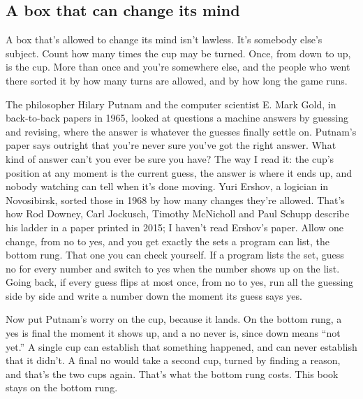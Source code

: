 \documentclass[11pt,twoside]{article}
\theoremstyle{thielethm}
\theoremstyle{thieledef}
\theoremstyle{thieledef}
\theoremstyle{thieledef}
\theoremstyle{thielethm}
\theoremstyle{thieleobs}
\theoremstyle{thielethm}
\begin{document}
\subsection{A box that can change its mind}

A box that's allowed to change its mind isn't lawless. It's somebody else's subject. Count how many times the cup may be turned. Once, from down to up, is the cup. More than once and you're somewhere else, and the people who went there sorted it by how many turns are allowed, and by how long the game runs.

The philosopher Hilary Putnam and the computer scientist E. Mark Gold, in back-to-back papers in 1965, looked at questions a machine answers by guessing and revising, where the answer is whatever the guesses finally settle on. Putnam's paper says outright that you're never sure you've got the right answer. What kind of answer can't you ever be sure you have? The way I read it: the cup's position at any moment is the current guess, the answer is where it ends up, and nobody watching can tell when it's done moving. Yuri Ershov, a logician in Novosibirsk, sorted those in 1968 by how many changes they're allowed. That's how Rod Downey, Carl Jockusch, Timothy McNicholl and Paul Schupp describe his ladder in a paper printed in 2015; I haven't read Ershov's paper. Allow one change, from no to yes, and you get exactly the sets a program can list, the bottom rung. That one you can check yourself. If a program lists the set, guess no for every number and switch to yes when the number shows up on the list. Going back, if every guess flips at most once, from no to yes, run all the guessing side by side and write a number down the moment its guess says yes.

Now put Putnam's worry on the cup, because it lands. On the bottom rung, a yes is final the moment it shows up, and a no never is, since down means ``not yet.'' A single cup can establish that something happened, and can never establish that it didn't. A final no would take a second cup, turned by finding a reason, and that's the two cups again. That's what the bottom rung costs. This book stays on the bottom rung.
\end{document}
